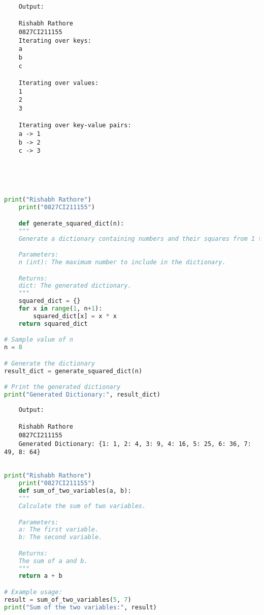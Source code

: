 \documentclass{report}
\begin{document}
\begin{verbatim}
	Output:

	Rishabh Rathore
	0827CI211155
	Iterating over keys:
	a
	b
	c
	
	Iterating over values:
	1
	2
	3
	
	Iterating over key-value pairs:
	a -> 1
	b -> 2
	c -> 3
	
	
	
	

\end{verbatim}

\newpage


\sol 
\begin{lstlisting}[language=Python]
	print("Rishabh Rathore")
	print("0827CI211155")

	def generate_squared_dict(n):
    """
    Generate a dictionary containing numbers and their squares from 1 to n.

    Parameters:
    n (int): The maximum number to include in the dictionary.

    Returns:
    dict: The generated dictionary.
    """
    squared_dict = {}
    for x in range(1, n+1):
        squared_dict[x] = x * x
    return squared_dict

# Sample value of n
n = 8

# Generate the dictionary
result_dict = generate_squared_dict(n)

# Print the generated dictionary
print("Generated Dictionary:", result_dict)

\end{lstlisting}

\begin{verbatim}
	Output:

	Rishabh Rathore
	0827CI211155
	Generated Dictionary: {1: 1, 2: 4, 3: 9, 4: 16, 5: 25, 6: 36, 7: 49, 8: 64}


\end{verbatim}

\newpage


\sol 
\begin{lstlisting}[language=Python]
	print("Rishabh Rathore")
	print("0827CI211155")
	def sum_of_two_variables(a, b):
    """
    Calculate the sum of two variables.

    Parameters:
    a: The first variable.
    b: The second variable.

    Returns:
    The sum of a and b.
    """
    return a + b

# Example usage:
result = sum_of_two_variables(5, 7)
print("Sum of the two variables:", result)
  

\end{lstlisting}
\end{document}
